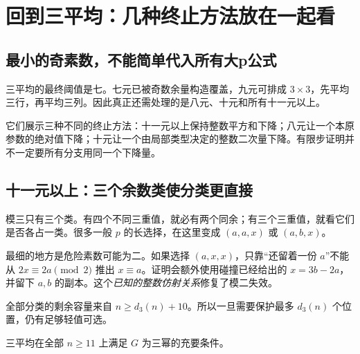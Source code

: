\chapter{回到三平均：几种终止方法放在一起看}\label{ch:three}
\section{最小的奇素数，不能简单代入所有大p公式}
三平均的最终阈值是七。七元已被奇数余量构造覆盖，九元可排成 $3\times3$，先平均三行，再平均三列。因此真正还需处理的是八元、十元和所有十一元以上。

它们展示三种不同的终止方法：十一元以上保持整数平方和下降；八元让一个本原参数的绝对值下降；十元让一个由局部类型决定的整数二次量下降。有限步证明并不一定要所有分支用同一个下降量。

\section{十一元以上：三个余数类使分类更直接}
模三只有三个类。有四个不同三重值，就必有两个同余；有三个三重值，就看它们是否各占一类。很多一般 $p$ 的长选择，在这里变成 $(a,a,x)$ 或 $(a,b,x)$。

最细的地方是危险素数可能为二。如果选择 $(a,x,x)$，只靠“还留着一份 $a$”不能从 $2x\equiv2a\pmod2$ 推出 $x\equiv a$。证明会额外使用碰撞已经给出的 $x=3b-2a$，并留下 $a,b$ 的副本。这个\emph{已知的整数仿射关系}修复了模二失效。

全部分类的剩余容量来自 $n\ge d_3(n)+10$。所以一旦需要保护最多 $d_3(n)$ 个位置，仍有足够轻值可选。
\begin{lemma}[三平均的全部n至少11]\label{lem:triple-large}
三平均在全部 $n\ge11$ 上满足 $G$ 为三幂的充要条件。
\end{lemma}

